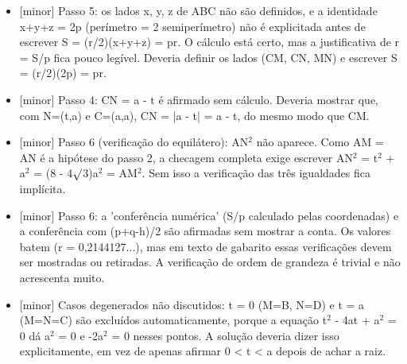 \documentclass{article}%
\begin{document}
\begin{itemize}%
\item%
{[}minor{]} Passo 5: os lados x, y, z de ABC não são definidos, e a identidade x+y+z = 2p (perímetro = 2 semiperímetro) não é explicitada antes de escrever S = (r/2)(x+y+z) = pr. O cálculo está certo, mas a justificativa de r = S/p fica pouco legível. Deveria definir os lados (CM, CN, MN) e escrever S = (r/2)(2p) = pr.%
\item%
{[}minor{]} Passo 4: CN = a - t é afirmado sem cálculo. Deveria mostrar que, com N=(t,a) e C=(a,a), CN = |a - t| = a - t, do mesmo modo que CM.%
\item%
{[}minor{]} Passo 6 (verificação do equilátero): AN$^2$ não aparece. Como AM = AN é a hipótese do passo 2, a checagem completa exige escrever AN$^2$ = t$^2$ + a$^2$ = (8 - 4$\surd$3)a$^2$ = AM$^2$. Sem isso a verificação das três igualdades fica implícita.%
\item%
{[}minor{]} Passo 6: a 'conferência numérica' (S/p calculado pelas coordenadas) e a conferência com (p+q-h)/2 são afirmadas sem mostrar a conta. Os valores batem (r = 0,2144127...), mas em texto de gabarito essas verificações devem ser mostradas ou retiradas. A verificação de ordem de grandeza é trivial e não acrescenta muito.%
\item%
{[}minor{]} Casos degenerados não discutidos: t = 0 (M=B, N=D) e t = a (M=N=C) são excluídos automaticamente, porque a equação t$^2$ - 4at + a$^2$ = 0 dá a$^2$ = 0 e -2a$^2$ = 0 nesses pontos. A solução deveria dizer isso explicitamente, em vez de apenas afirmar 0 < t < a depois de achar a raiz.%
\end{itemize}%
\end{document}
